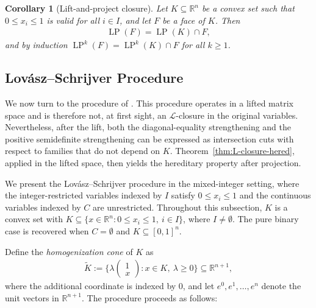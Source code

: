 \documentclass{article}
\newtheorem{corollary}{Corollary}
\newcommand{\R}{\mathbb{R}}
\renewcommand{\L}{\mathcal{L}}
\begin{document}
\begin{corollary}[Lift-and-project closure] \label{cor:lp-hered}
    Let $K \subseteq \R^n$ be a convex set such that $0 \leq x_i \leq 1$ is valid for all $i \in I$, and let $F$ be a face of $K$. Then
    \begin{align}
        \operatorname{LP}(F) = \operatorname{LP}(K) \cap F,
    \end{align}
    and by induction $\operatorname{LP}^k(F) = \operatorname{LP}^k(K) \cap F$ for all $k \geq 1$.
\end{corollary}

\subsection{Lov\'asz--Schrijver Procedure} \label{sec:lovasz-schrijver}

We now turn to the procedure of \cite{lovasz1991cones}. This procedure operates in a lifted matrix space and is therefore not, at first sight, an $\L$-closure in the original variables. Nevertheless, after the lift, both the diagonal-equality strengthening and the positive semidefinite strengthening can be expressed as intersection cuts with respect to families that do not depend on $K$. Theorem~\ref{thm:L-closure-hered}, applied in the lifted space, then yields the hereditary property after projection.

We present the Lov\'asz--Schrijver procedure in the mixed-integer setting, where the integer-restricted variables indexed by $I$ satisfy $0 \leq x_i \leq 1$ and the continuous variables indexed by $C$ are unrestricted. Throughout this subsection, $K$ is a convex set with $K \subseteq \{x \in \R^n : 0 \leq x_i \leq 1,\ i \in I\}$, where $I \neq \emptyset$. The pure binary case is recovered when $C = \emptyset$ and $K \subseteq [0,1]^n$.

Define the \emph{homogenization cone} of $K$ as
\begin{align}
    \tilde K := \big\{ \lambda \begin{pmatrix} 1 \\ x \end{pmatrix} : x \in K,\ \lambda \geq 0 \big\} \subseteq \R^{n+1}, \label{def:hom-cone}
\end{align}
where the additional coordinate is indexed by $0$, and let $e^0,e^1,\ldots,e^n$ denote the unit vectors in $\R^{n+1}$. The procedure proceeds as follows:
\end{document}

